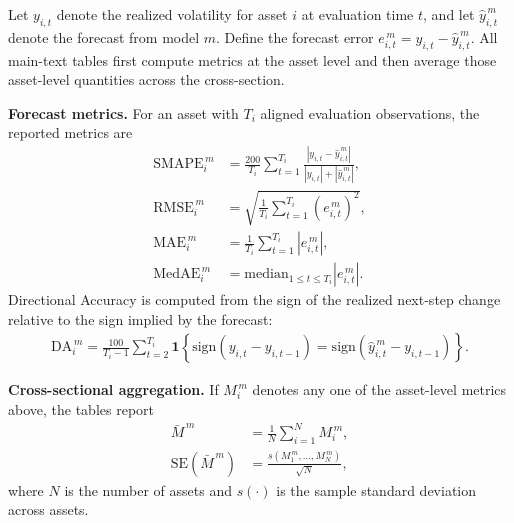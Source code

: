\documentclass[a4paper]{article}
\begin{document}
\noindent
Let $y_{i,t}$ denote the realized volatility for asset $i$ at evaluation time $t$, and let $\hat{y}^{\,m}_{i,t}$ denote the forecast from model $m$. Define the forecast error $e^{\,m}_{i,t} = y_{i,t} - \hat{y}^{\,m}_{i,t}$. All main-text tables first compute metrics at the asset level and then average those asset-level quantities across the cross-section.

\vspace{0.15cm}
\noindent \textbf{Forecast metrics.}
For an asset with $T_i$ aligned evaluation observations, the reported metrics are
\begin{align*}
\mathrm{SMAPE}^{\,m}_i &= \frac{200}{T_i}\sum_{t=1}^{T_i}\frac{|y_{i,t}-\hat{y}^{\,m}_{i,t}|}{|y_{i,t}|+|\hat{y}^{\,m}_{i,t}|},\\
\mathrm{RMSE}^{\,m}_i &= \sqrt{\frac{1}{T_i}\sum_{t=1}^{T_i}\left(e^{\,m}_{i,t}\right)^2},\\
\mathrm{MAE}^{\,m}_i &= \frac{1}{T_i}\sum_{t=1}^{T_i}\left|e^{\,m}_{i,t}\right|,\\
\mathrm{MedAE}^{\,m}_i &= \mathrm{median}_{1 \leq t \leq T_i}\left|e^{\,m}_{i,t}\right|.
\end{align*}
Directional Accuracy is computed from the sign of the realized next-step change relative to the sign implied by the forecast:
\begin{align*}
\mathrm{DA}^{\,m}_i
= \frac{100}{T_i-1}\sum_{t=2}^{T_i}
\mathbf{1}\!\left\{
\mathrm{sign}(y_{i,t}-y_{i,t-1})
=
\mathrm{sign}(\hat{y}^{\,m}_{i,t}-y_{i,t-1})
\right\}.
\end{align*}

\vspace{0.15cm}
\noindent \textbf{Cross-sectional aggregation.}
If $M_i^{\,m}$ denotes any one of the asset-level metrics above, the tables report
\begin{align*}
\bar{M}^{\,m} &= \frac{1}{N}\sum_{i=1}^{N} M_i^{\,m},\\
\mathrm{SE}\!\left(\bar{M}^{\,m}\right) &= \frac{s(M_1^{\,m},\ldots,M_N^{\,m})}{\sqrt{N}},
\end{align*}
where $N$ is the number of assets and $s(\cdot)$ is the sample standard deviation across assets.
\end{document}

